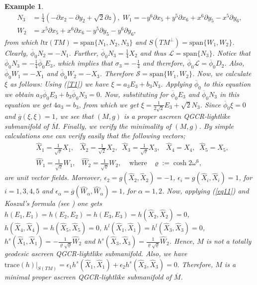 \documentclass[reqno, 12pt]{amsart}
\numberwithin{equation}{section}
\newtheorem{example}[theorem]{Example}
\begin{document}
\begin{example}
{\begin{align}
 N_{3} & =\frac{1}{4}(- \partial x_{2} - \partial y_{2}+\sqrt{2}\partial z),\;   W_{1}=-y^{6}\partial x_{5}+y^{5}\partial x_{6}+x^{6}\partial y_{5}-x^{5}\partial y_{6}, \nonumber\\
 W_{2}&=x^{5}\partial x_{5}+x^{6}\partial x_{6}-y^{5}\partial y_{5}-y^{6}\partial y_{6},\nonumber
\end{align}
from which $l\mathrm{tr}(TM)=\mathrm{span}\{N_{1},N_{2},N_{3}\}$ and 
$S(TM^\perp)=\mathrm{span}\{W_{1},W_{2}\}$. Clearly, $\overline{\phi}_{0} N_{2}=-N_{1}$. 
Further, $\overline{\phi}_0 N_{3}=\frac{1}{4} X_{2}$ and thus 
$\mathcal{L}=\mbox{span}\{N_{3}\}$. Notice that 
$\overline{\phi}_{0}N_{3}=-\frac{1}{4}\overline{\phi}_{0} E_{3}$, which implies that $\sigma_{3}=-\frac{1}{4}$ and therefore, 
$\overline{\phi}_0\mathcal{L}=\overline{\phi}_{0} D_{2}$. Also, $\overline{\phi}_{0} 
W_{1}=-X_{1}$ and $\overline{\phi}_{0} 
W_{2}=-X_{3}$. Therefore $\mathcal{S}=\mbox{span}\{W_{1},W_{2}\}$. Now, we calculate 
$\xi$ as follows: Using (\ref{T1}) we have $\xi=a_{3} E_{3}+b_{3} N_{3}$. Applying 
$\overline{\phi}_{0}$ to this equation we obtain $a_{3}\overline{\phi}_{0} 
E_{3}+b_{3}\overline{\phi}_{0} N_{3}=0$. Now, substituting for $\overline{\phi}_{0} E_{3}$ and 
 $\overline{\phi}_{0} N_{3}$ in this equation we get $4a_{3}=b_{3}$, from which we get 
$\xi=\frac{1}{2\sqrt{2}}E_{3}+\sqrt{2}N_{3}$. Since $\overline{\phi}_0\xi=0$ and 
$\overline{g}(\xi,\xi)=1$, we see that $(M,g)$ is a proper ascreen QGCR-lightlike 
submanifold of $\overline{M}$. Finally, we verify the minimality of $(M,g)$. By simple calculations one can verify easily that the following vectors;
\begin{align*}
 & \widehat{X}_{1}=\frac{1}{\sqrt{\varrho}}X_{1},\;\;\; \widehat{X}_{2}=\frac{1}{\sqrt{2}}X_{2},\;\;\widehat{X}_{3}=\frac{1}{\sqrt{\varrho}}X_{3},\;\;\;\widehat{X}_{4}=X_{4},\;\;\widehat{X}_{5}=X_{5},\\
 &\widehat{W}_{1}=\frac{1}{\sqrt{\varrho}}W_{1},\;\;\;\widehat{W}_{2}=\frac{1}{\sqrt{\varrho}}W_{2},\;\;\;\;\mbox{where}\;\;\; \varrho:=\cosh2\omega^{6},
\end{align*}
are unit vector fields. Moreover,  $\epsilon_{2}=g(\widehat{X}_{2},\widehat{X}_{2})=-1$, $\epsilon_{i}=g(\widehat{X}_{i},\widehat{X}_{i})=1$, for $i=1,3,4,5$ and $\epsilon_{\alpha}=\overline{g}(\widehat{W}_{\alpha},\widehat{W}_{\alpha})=1$, for $\alpha=1,2$. Now, applying (\ref{eq11}) and Koszul's formula (see \cite{db}) one gets $ h(E_{1},E_{1}) =h(E_{2},E_{2})=h(E_{3},E_{3})=h(\widehat{X}_{2},\widehat{X}_{2})=0$, $ h(\widehat{X}_{4},\widehat{X}_{4})=h(\widehat{X}_{5},\widehat{X}_{5})=0$, $h^{l}(\widehat{X}_{1},\widehat{X}_{1})=h^{l}(\widehat{X}_{3},\widehat{X}_{3})=0$, $h^{s}(\widehat{X}_{1},\widehat{X}_{1}) =-\frac{1}{\varrho\sqrt{\varrho}}\widehat{W}_{2}$ and $h^{s}(\widehat{X}_{3},\widehat{X}_{3})=\frac{1}{\varrho\sqrt{\varrho}}\widehat{W}_{2}$. Hence, $M$ is not a totally geodesic ascreen QGCR-lightlike submanifold. Also, we have
$
 \mathrm{trace}(h)|_{S(TM)}=\epsilon_{1}h^{s}(\widehat{X}_{1},\widehat{X}_{1})+\epsilon_{2}h^{s}(\widehat{X}_{3},\widehat{X}_{3})=0.
$
Therefore, $M$ is a minimal proper ascreen QGCR-lightlike submanifold of $\overline{M}$.
}
\end{example}
\end{document}
